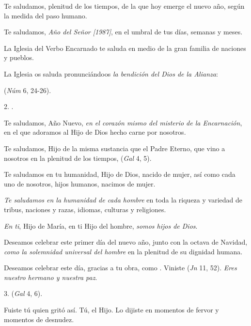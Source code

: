 \begin{body}
	Te saludamos, plenitud de los tiempos, de la que hoy emerge el nuevo año, según la medida del paso humano.

	Te saludamos, \emph{Año del Señor {[}1987{]}}, en el umbral de tus días, semanas y meses.

	La Iglesia del Verbo Encarnado te saluda en medio de la gran familia de naciones y pueblos.

	La Iglesia os saluda pronunciándoos \emph{la bendición del Dios de la 	Alianza}:

	 (\emph{Núm} 6, 24-26).

	2. .

	Te saludamos, Año Nuevo, \emph{en el corazón mismo del misterio de la 	Encarnación}, en el que adoramos al Hijo de Dios hecho carne por nosotros.

	Te saludamos, Hijo de la misma sustancia que el Padre Eterno, que vino a nosotros en la plenitud de los tiempos,  (\emph{Gal} 4, 5).

	Te saludamos en tu humanidad, Hijo de Dios, nacido de mujer, así como cada uno de nosotros, hijos humanos, nacimos de mujer.

	\emph{Te saludamos en la humanidad de cada hombre} en toda la riqueza y variedad de tribus, naciones y razas, idiomas, culturas y religiones.

	\emph{En ti}, Hijo de María, en ti Hijo del hombre, \emph{somos hijos de 	Dios}.

	Deseamos celebrar este primer día del nuevo año, junto con la octava de Navidad, \emph{como la solemnidad universal del hombre} en la plenitud de su dignidad humana.

	Deseamos celebrar este día, gracias a tu obra, como . Viniste  (\emph{Jn} 11, 52). \emph{Eres nuestro hermano y nuestra paz}.

	3.  (\emph{Gal} 4, 6).

	Fuiste tú quien gritó así. Tú, el Hijo. Lo dijiste en momentos de fervor y momentos de desnudez.


\end{body}
